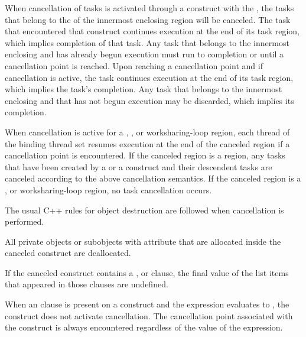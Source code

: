 When cancellation of tasks is activated through a  construct with
the  , the tasks that belong to the
 of the innermost enclosing  region
will be canceled. The task that encountered that construct continues execution
at the end of its task region, which implies completion of that
task. Any task that belongs to the innermost enclosing
 and has already begun execution must run to
completion or until a cancellation point is reached. Upon reaching a
cancellation point and if cancellation is active, the task continues
execution at the end of its task region, which implies the
task's completion. Any task that belongs to the innermost enclosing
 and that has not begun execution may be discarded,
which implies its completion.

When cancellation is active for a , , or
worksharing-loop region, each thread of the binding thread set resumes 
execution at the end of the canceled region if a cancellation point is 
encountered. If the canceled region is a  region, any
tasks that have been created by a  or a  construct and their descendent 
tasks are canceled according to the above  cancellation 
semantics. If the canceled region is a , or worksharing-loop 
region, no task cancellation occurs.

\begin{cppspecific}
The usual C++ rules for object destruction are followed when cancellation is performed.
\end{cppspecific}

\begin{fortranspecific}
All private objects or subobjects with  attribute that 
are allocated inside the canceled construct are deallocated.
\end{fortranspecific}

If the canceled construct contains a ,  
or  clause, the final value of the list items that 
appeared in those clauses are undefined.

When an  clause is present on a  construct and the 
 expression evaluates to , the  construct 
does not activate cancellation. The cancellation point associated with the 
 construct is always encountered regardless of the value of
the  expression.

